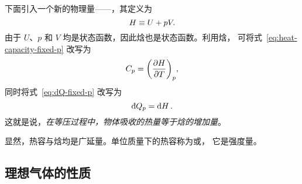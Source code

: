 下面引入一个新的物理量——，其定义为
\begin{equation}
  H \equiv U + p V.
\end{equation}
由于 $U$、$p$ 和 $V$ 均是状态函数，因此焓也是状态函数。利用焓，
可将式~\eqref{eq:heat-capacity-fixed-p} 改写为
\begin{equation} \label{eq:heat-capacity-fixed-p-with-H}
  C_p = \qty(\pdv{H}{T})_p,
\end{equation}
同时将式~\eqref{eq:dQ-fixed-p} 改写为
\begin{equation}
  \dbar{Q_p} = \dd{H}.
\end{equation}
这就是说，\emph{在等压过程中，物体吸收的热量等于焓的增加量}。

显然，热容与焓均是广延量。单位质量下的热容称为或，
它是强度量。

\subsection{理想气体的性质} \label{subsec:ideal-gas-property} %

